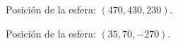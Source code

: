 \documentclass[a4paper,12pt]{article}
\begin{document}
\begin{figure}[h]
    \centering
    \caption{Posición de la esfera: $(470, 430, 230)$.} \label{esfera_posicion_lejos}
\end{figure}
\begin{figure}[h]
    \centering
    \caption{Posición de la esfera: $(35, 70, -270)$.} \label{esfera_posicion_cerca}
\end{figure}
\end{document}
